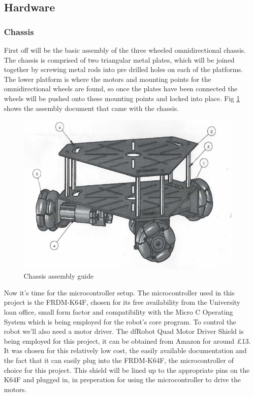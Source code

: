 			\subsection{Hardware}
				\subsubsection{Chassis}
				First off will be the basic assembly of the three wheeled omnidirectional chassis. The chassis is comprised of two triangular metal plates, which will be joined together by screwing metal rods into pre drilled holes on each of the platforms. The lower platform is where the motors and mounting points for the omnidirectional wheels are found, so once the plates have been connected the wheels will be pushed onto these mounting points and locked into place. Fig \ref{fig:chassisassembly} shows the assembly document that came with the chassis.
				\begin{figure}[h]
					\centering
					\includegraphics[width=.9\linewidth]{SYNTHESIS/chassisassembly.png}
					\caption{Chassis assembly guide}
					\label{fig:chassisassembly}
				\end{figure}
				
				Now it's time for the microcontroller setup. The microcontroller used in this project is the FRDM-K64F, chosen for its free availability from the University loan office, small form factor and compatibility with the Micro C Operating System which is being employed for the robot's core program. To control the robot we'll also need a motor driver. The dfRobot Quad Motor Driver Shield is being employed for this project, it can be obtained from Amazon for around \pounds{13}. It was chosen for this relatively low cost, the easily available documentation and the fact that it can easily plug into the FRDM-K64F, the microcontroller of choice for this project. This shield will be lined up to the appropriate pins on the K64F and plugged in, in preperation for using the microcontroller to drive the motors. 
				
